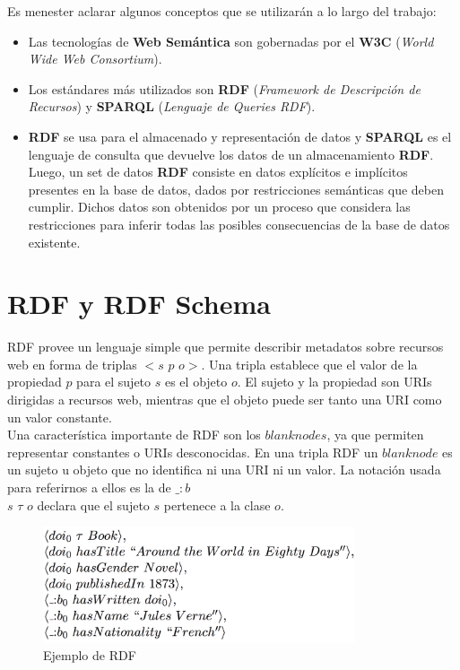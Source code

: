 \documentclass[10pt,a4paper]{article}
\begin{document}
Es menester aclarar algunos conceptos que se utilizarán a lo largo del trabajo:
\begin{itemize}
\item Las tecnologías de \textbf{Web Semántica} son gobernadas por el \textbf{W3C} (\textit{World Wide Web Consortium}).
\item Los estándares más utilizados son \textbf{RDF} (\textit{Framework de Descripción de Recursos}) y \textbf{SPARQL} (\textit{Lenguaje de Queries RDF}).
\item \textbf{RDF} se usa para el almacenado y representación de datos y \textbf{SPARQL} es el lenguaje de consulta que devuelve los datos de un almacenamiento \textbf{RDF}.\\
Luego, un set de datos \textbf{RDF} consiste en datos explícitos e implícitos presentes en la base de datos, dados por restricciones semánticas que deben cumplir. Dichos datos son obtenidos por un proceso que considera las restricciones para inferir todas las posibles consecuencias de la base de datos existente.
\end{itemize}

\section{RDF y RDF Schema}
RDF provee un lenguaje simple que permite describir metadatos sobre recursos web en forma de triplas $<s$ $p$ $o>$. Una tripla establece que el valor de la propiedad $p$ para el sujeto $s$ es el objeto $o$. El sujeto y la propiedad son URIs dirigidas a recursos web, mientras que el objeto puede ser tanto una URI como un valor constante. 
\\
Una característica importante de RDF son los $blank nodes$, ya que permiten representar constantes o URIs desconocidas. En una tripla RDF un $blank node$ es un sujeto u objeto que no identifica ni una URI ni un valor. La notación usada para referirnos a ellos es la de $\_ :b$
\\
$s$ $\tau$ $o$ declara que el sujeto $s$ pertenece a la clase $o$.
  
\begin{figure}[H]
\begin{center}
\includegraphics[width=260pt]{imgs/ejemplo_rdf}
\caption{Ejemplo de RDF}
\end{center}
\end{figure}
\end{document}
